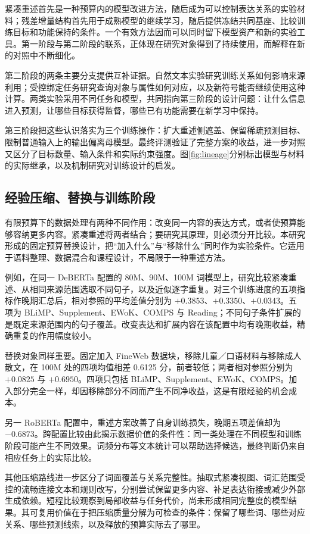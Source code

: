 紧凑重述首先是一种预算内的模型改进方法，随后成为可以控制表达关系的实验材料；残差增量结构首先用于成熟模型的继续学习，随后提供冻结共同基座、比较训练目标和功能保持的条件。一个有效方法因而可以同时留下模型资产和新的实验工具。第一阶段与第二阶段的联系，正体现在研究对象得到了持续使用，而解释在新的对照中不断细化。

第二阶段的两条主要分支提供互补证据。自然文本实验研究训练关系如何影响来源利用；受控绑定任务研究查询对象与属性如何对应，以及新符号能否继续使用这种计算。两类实验采用不同任务和模型，共同指向第三阶段的设计问题：让什么信息进入预测，让哪些目标获得监督，哪些已有功能需要在新学习中保持。

第三阶段把这些认识落实为三个训练操作：扩大重述侧遮盖、保留稀疏预测目标、限制普通输入上的输出偏离母模型。最终评测验证了完整方案的收益，进一步对照又区分了目标数量、输入条件和实际约束强度。图\ref{fig:lineage}分别标出模型与材料的实际继承，以及机制研究对训练设计的启发。

\subsection{经验压缩、替换与训练阶段}
\label{sec:experience_branch}

有限预算下的数据处理有两种不同作用：改变同一内容的表达方式，或者使预算能够容纳更多内容。紧凑重述将两者结合；要研究其原理，则必须分开比较。本研究形成的固定预算替换设计，把“加入什么”与“移除什么”同时作为实验条件。它适用于语料整理、数据混合和课程设计，不局限于一种重述方法。

例如，在同一 DeBERTa 配置的 80M、90M、100M 词模型上，研究比较紧凑重述、从相同来源范围选取不同句子，以及近似逐字重复。对三个训练进度的五项指标作晚期汇总后，相对参照的平均差值分别为 $+0.3853$、$+0.3350$、$+0.0343$。五项为 BLiMP、Supplement、EWoK、COMPS 与 Reading；不同句子条件扩展的是既定来源范围内的句子覆盖。改变表达和扩展内容在该配置中均有晚期收益，精确重复的作用幅度较小。

替换对象同样重要。固定加入 FineWeb 数据块，移除儿童／口语材料与移除成人散文，在 100M 处的四项均值相差 0.6125 分，前者较低；两者相对参照分别为 $+0.0825$ 与 $+0.6950$。四项只包括 BLiMP、Supplement、EWoK、COMPS。加入部分完全一样，却因移除部分不同而产生不同净收益，这是有限经验的机会成本。

另一 RoBERTa 配置中，重述方案改善了自身训练损失，晚期五项差值却为 $-0.6873$。跨配置比较由此揭示数据价值的条件性：同一类处理在不同模型和训练阶段可能产生不同效果。词频分布等文本统计可以帮助选择候选，最终判断仍来自相应任务上的实际比较。

其他压缩路线进一步区分了词面覆盖与关系完整性。抽取式紧凑视图、词汇范围受控的流畅连接文本和规则改写，分别尝试保留更多内容、补足表达衔接或减少外部生成依赖。短程比较观察到局部收益与任务代价，尚未形成相同完整度的模型结果。其可复用价值在于把压缩质量分解为可检查的条件：保留了哪些词、哪些对应关系、哪些预测线索，以及释放的预算实际去了哪里。

